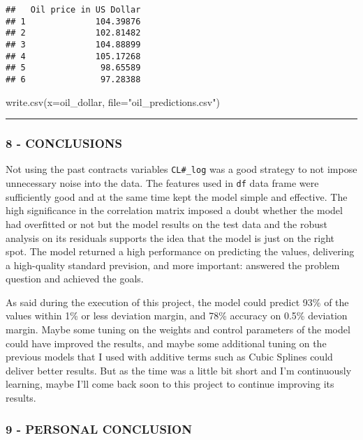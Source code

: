 \documentclass[
]{article}
\newenvironment{Shaded}{\begin{snugshade}}{\end{snugshade}}
\newcommand{\AttributeTok}[1]{\textcolor[rgb]{0.77,0.63,0.00}{#1}}
\newcommand{\FunctionTok}[1]{\textcolor[rgb]{0.00,0.00,0.00}{#1}}
\newcommand{\NormalTok}[1]{#1}
\newcommand{\StringTok}[1]{\textcolor[rgb]{0.31,0.60,0.02}{#1}}
\begin{document}
\begin{verbatim}
##   Oil price in US Dollar
## 1              104.39876
## 2              102.81482
## 3              104.88899
## 4              105.17268
## 5               98.65589
## 6               97.28388
\end{verbatim}

\begin{Shaded}
\begin{Highlighting}[]
\FunctionTok{write.csv}\NormalTok{(}\AttributeTok{x=}\NormalTok{oil\_dollar, }\AttributeTok{file=}\StringTok{"oil\_predictions.csv"}\NormalTok{)}
\end{Highlighting}
\end{Shaded}

\begin{center}\rule{0.5\linewidth}{0.5pt}\end{center}

\hypertarget{conclusions}{%
\subsubsection{8 - CONCLUSIONS}\label{conclusions}}

Not using the past contracts variables \texttt{CL\#\_log} was a good
strategy to not impose unnecessary noise into the data. The features
used in \texttt{df} data frame were sufficiently good and at the same
time kept the model simple and effective. The high significance in the
correlation matrix imposed a doubt whether the model had overfitted or
not but the model results on the test data and the robust analysis on
its residuals supports the idea that the model is just on the right
spot. The model returned a high performance on predicting the values,
delivering a high-quality standard prevision, and more important:
answered the problem question and achieved the goals.

As said during the execution of this project, the model could predict
93\% of the values within 1\% or less deviation margin, and 78\%
accuracy on 0.5\% deviation margin. Maybe some tuning on the weights and
control parameters of the model could have improved the results, and
maybe some additional tuning on the previous models that I used with
additive terms such as Cubic Splines could deliver better results. But
as the time was a little bit short and I'm continuously learning, maybe
I'll come back soon to this project to continue improving its results.

\hypertarget{personal-conclusion}{%
\subsubsection{9 - PERSONAL CONCLUSION}\label{personal-conclusion}}
\end{document}
